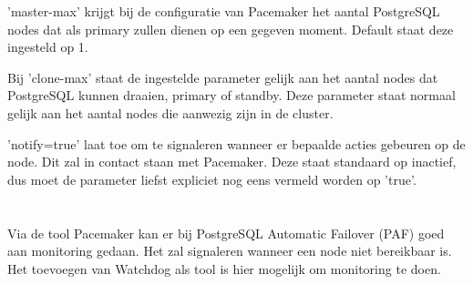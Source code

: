 'master-max' krijgt bij de configuratie van Pacemaker het aantal PostgreSQL nodes dat als primary zullen dienen op een gegeven moment. Default staat deze ingesteld op 1.

Bij 'clone-max' staat de ingestelde parameter gelijk aan het aantal nodes dat PostgreSQL kunnen draaien, primary of standby. Deze parameter staat normaal gelijk aan het aantal nodes die aanwezig zijn in de cluster.

'notify=true' laat toe om te signaleren wanneer er bepaalde acties gebeuren op de node. Dit zal in contact staan met Pacemaker. Deze staat standaard op inactief, dus moet de parameter liefst expliciet nog eens vermeld worden op 'true'.

\section{}
\label{sec:Monitoring}

Via de tool Pacemaker kan er bij PostgreSQL Automatic Failover (PAF) goed aan monitoring gedaan. Het zal signaleren wanneer een node niet bereikbaar is.
Het toevoegen van Watchdog als tool is hier mogelijk om monitoring te doen.